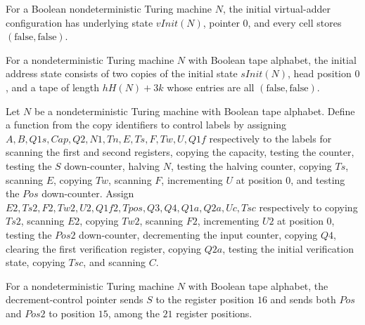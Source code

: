 \begin{definition}
\label{Complexity.Codec.vAd0}
\leanok
{}
For a Boolean nondeterministic Turing machine $N$, the initial virtual-adder
configuration has underlying state $vInit(N)$, pointer $0$, and every cell stores
$(\mathrm{false},\mathrm{false})$.
\end{definition}

\begin{definition}
\label{Complexity.Codec.sAd0}
\leanok
{}
For a nondeterministic Turing machine $N$ with Boolean tape alphabet, the initial
address state consists of two copies of the initial state $sInit(N)$, head position $0$,
and a tape of length $hH(N)+3k$ whose entries are all $(\mathrm{false},\mathrm{false})$.
\end{definition}

\begin{definition}
\label{Complexity.Codec.cpNext}
\leanok
{}
Let $N$ be a nondeterministic Turing machine with Boolean tape alphabet. Define a
function from the copy identifiers to control labels by assigning
$A,B,Q1s,Cap,Q2,N1,Tn,E,Ts,F,Tw,U,Q1f$ respectively to the labels for scanning the first
and second registers, copying the capacity, testing the counter, testing the $S$
down-counter, halving $N$, testing the halving counter, copying $Ts$, scanning $E$,
copying $Tw$, scanning $F$, incrementing $U$ at position $0$, and testing the $Pos$
down-counter. Assign $E2,Ts2,F2,Tw2,U2,Q1f2,Tpos,Q3,Q4,Q1a,Q2a,Uc,Tsc$ respectively to
copying $Ts2$, scanning $E2$, copying $Tw2$, scanning $F2$, incrementing $U2$ at
position $0$, testing the $Pos2$ down-counter, decrementing the input counter, copying
$Q4$, clearing the first verification register, copying $Q2a$, testing the initial
verification state, copying $Tsc$, and scanning $C$.
\end{definition}

\begin{definition}
\label{Complexity.Codec.dcPtr}
\leanok
{}
For a nondeterministic Turing machine $N$ with Boolean tape alphabet, the
decrement-control pointer sends $S$ to the register position $16$ and sends both $Pos$
and $Pos2$ to position $15$, among the $21$ register positions.
\end{definition}

